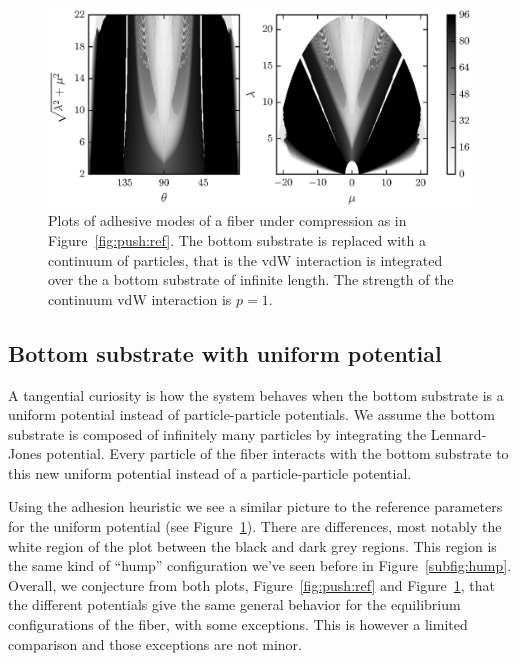 	\begin{figure}[t]
		\begin{center}
			\includegraphics{./fig/ch3/push/p1/grid.eps}
		\end{center}		
		\caption{Plots of adhesive modes of a fiber under compression as in Figure~\ref{fig:push:ref}. The bottom substrate is replaced with a continuum of particles, that is the vdW interaction is integrated over the a bottom substrate of infinite length. The strength of the continuum vdW interaction is $p=1$.
		\label{fig:push:p1}}
	\end{figure}

\subsection{Bottom substrate with uniform potential} \label{section:compression:pressure}

A tangential curiosity is how the system behaves when the bottom substrate is a uniform potential instead of particle-particle potentials. We assume the bottom substrate is composed of infinitely many particles by integrating the Lennard-Jones potential. Every particle of the fiber interacts with the bottom substrate to this new uniform potential instead of a particle-particle potential.

Using the adhesion heuristic we see a similar picture to the reference parameters for the uniform potential (see Figure~\ref{fig:push:p1}). There are differences, most notably the white region of the plot between the black and dark grey regions. This region is the same kind of ``hump'' configuration we've seen before in Figure~\ref{subfig:hump}. Overall, we conjecture from both plots, Figure~\ref{fig:push:ref} and Figure~\ref{fig:push:p1}, that the different potentials give the same general behavior for the equilibrium configurations of the fiber, with some exceptions. This is however a limited comparison and those exceptions are not minor.

